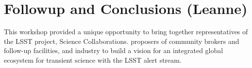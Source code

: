 \section{Followup and Conclusions (Leanne)} \label{sec:conclusions}

 This workshop provided a unique opportunity to bring together representatives of the LSST project, Science Collaborations.  proposers of community brokers and follow-up facilities, and industry to build a vision for an integrated global ecosystem for transient science with the LSST alert stream.
 
 
